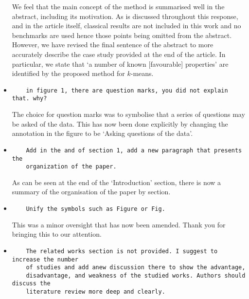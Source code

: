 \documentclass[11pt]{article}
\begin{document}
\begin{itemize}
We feel that the main concept of the method is summarised well in the abstract,
including its motivation. As is discussed throughout this response, and in the
article itself, classical results are not included in this work and no
benchmarks are used hence those points being omitted from the abstract. However,
we have revised the final sentence of the abstract to more accurately describe
the case study provided at the end of the article. In particular, we state that
`a number of known [favourable] properties' are identified by the proposed
method for \(k\)-means.

\item
\begin{verbatim}
    in figure 1, there are question marks, you did not explain that. why?
\end{verbatim}

The choice for question marks was to symbolise that a series of questions may be
asked of the data. This has now been done explicitly by changing the annotation
in the figure to be `Asking questions of the data'.

\item
\begin{verbatim}
    Add in the and of section 1, add a new paragraph that presents the
    organization of the paper.
\end{verbatim}

As can be seen at the end of the `Introduction' section, there is now a summary
of the organisation of the paper by section.

\item
\begin{verbatim}
    Unify the symbols such as Figure or Fig.
\end{verbatim}

This was a minor oversight that has now been amended. Thank you for bringing
this to our attention.

\item
\begin{verbatim}
    The related works section is not provided. I suggest to increase the number
    of studies and add anew discussion there to show the advantage,
    disadvantage, and weakness of the studied works. Authors should discuss the
    literature review more deep and clearly.
\end{verbatim}



\end{itemize}
\end{document}
